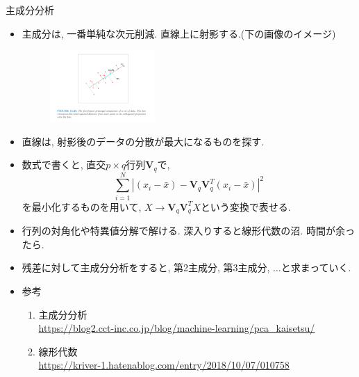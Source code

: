 \documentclass[dvipdfmx,8pt]{beamer}
\begin{document}
  \begin{frame}{主成分分析}
    \begin{itemize}
      \item 主成分は, 一番単純な次元削減. 直線上に射影する.(下の画像のイメージ)\\
        \begin{figure}[htb]
          \centering
          \includegraphics[width=4cm,clip]{images/pca.png}
        \end{figure}
      \item 直線は, 射影後のデータの分散が最大になるものを探す.
      \item 数式で書くと, 直交$p\times q$行列$\mathbf{V}_q$で,
        \[
          \sum_{i=1}^N|(x_i-\bar{x})-\mathbf{V}_q\mathbf{V}_q^T(x_i-\bar{x})|^2
        \]
        を最小化するものを用いて, $X \to \mathbf{V}_q\mathbf{V}_q^TX$という変換で表せる.
      \item 行列の対角化や特異値分解で解ける. 深入りすると線形代数の沼. 時間が余ったら.
      \item 残差に対して主成分分析をすると, 第2主成分, 第3主成分, $\dots$と求まっていく.
      \item 参考\\
        \begin{enumerate}
          \item 主成分分析\\
            \url{https://blog2.cct-inc.co.jp/blog/machine-learning/pca_kaisetsu/}\\
          \item 線形代数\\
            \url{https://kriver-1.hatenablog.com/entry/2018/10/07/010758}
        \end{enumerate}
    \end{itemize}
  \end{frame}
\end{document}
